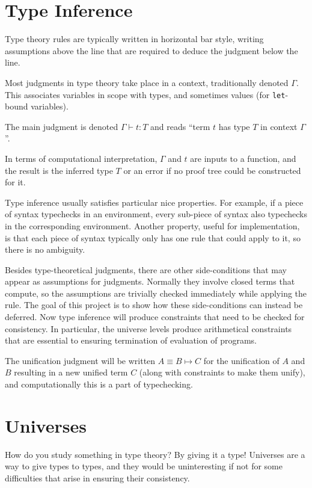 \documentclass[11pt, twoside, reqno]{book}
\begin{document}
\chapter{Type Inference}
\label{type-inf}

Type theory rules are typically written in horizontal bar style, writing assumptions above the line that are required to deduce the judgment below the line.

Most judgments in type theory take place in a context, traditionally denoted $\Gamma$.
This associates variables in scope with types, and sometimes values (for \verb`let`-bound variables).

The main judgment is denoted $\Gamma \vdash t : T$ and reads ``term $t$ has type $T$ in context $\Gamma$''.

In terms of computational interpretation, $\Gamma$ and $t$ are inputs to a function, and the result is the inferred type $T$ or an error if no proof tree could be constructed for it.

Type inference usually satisfies particular nice properties.
For example, if a piece of syntax typechecks in an environment, every sub-piece of syntax also typechecks in the corresponding environment.
Another property, useful for implementation, is that each piece of syntax typically only has one rule that could apply to it, so there is no ambiguity.

Besides type-theoretical judgments, there are other side-conditions that may appear as assumptions for judgments.
Normally they involve closed terms that compute, so the assumptions are trivially checked immediately while applying the rule.
The goal of this project is to show how these side-conditions can instead be deferred.
Now type inference will produce constraints that need to be checked for consistency.
In particular, the universe levels produce arithmetical constraints that are essential to ensuring termination of evaluation of programs.

The unification judgment will be written $A \equiv B \mapsto C$ for the unification of $A$ and $B$ resulting in a new unified term $C$ (along with constraints to make them unify), and computationally this is a part of typechecking.

\chapter{Universes}
\label{universes}

How do you study something in type theory?
By giving it a type!
Universes are a way to give types to types, and they would be uninteresting if not for some difficulties that arise in ensuring their consistency.
\end{document}
